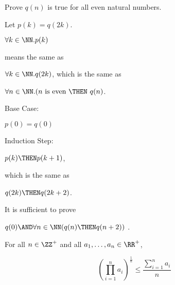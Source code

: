 \documentclass[11pt]{scrartcl}
\begin{document}
\begin{problem*}
Prove $q(n)$ is true for all even natural numbers.
\end{problem*}

\begin{soln}
  Let $p(k) = q(2k)$.

  $\forall k\in \NN. p(k)$

  means the same as

  $\forall k\in \NN. q(2k)$, which is the same as

  $\forall n \in \NN.(\text{$n$ is even $\THEN$ $q(n)$}$.

  Base Case:

  $p(0) = q(0)$

  Induction Step:

  $p(k) \THEN p(k+1)$,

  which is the same as

  $q(2k) \THEN q(2k+2)$.

  It is sufficient to prove

  $q(0) \AND \forall n\in\NN(q(n)\THEN q(n+2))$ .
\end{soln}

\begin{theorem}
  For all $n\in\ZZ^{+}$ and all $a_1, \dots, a_n\in \RR^+$,

  \begin{equation*}
    (\prod_{i=1}^na_i)^{\frac{1}{n}}\leq \frac{\sum_{i=1}^na_i}{n}
  \end{equation*}
\end{theorem}
\end{document}
